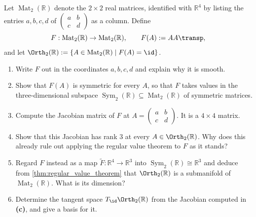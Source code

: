 \begin{exercise}
\label{ex:orthogonal_group_submanifold}
Let $\operatorname{Mat}_2(\mathbb{R})$ denote the $2\times 2$ real matrices, identified with
$\mathbb{R}^4$ by listing the entries $a,b,c,d$ of
$\left(\begin{smallmatrix} a & b \\ c & d\end{smallmatrix}\right)$ as a column. Define
\[F : \operatorname{Mat}_2(\mathbb{R}) \to \operatorname{Mat}_2(\mathbb{R}), \qquad
F(A) := AA\transp,\]
and let $\Orth_2(\mathbb{R}) := \{A \in \operatorname{Mat}_2(\mathbb{R}) \mid F(A) = \id\}$.
\begin{enumerate}[label=\textbf{(\alph*)}]
  \item Write $F$ out in the coordinates $a,b,c,d$ and explain why it is smooth.
  \item Show that $F(A)$ is symmetric for every $A$, so that $F$ takes values in the
    three-dimensional subspace $\operatorname{Sym}_2(\mathbb{R}) \subseteq
    \operatorname{Mat}_2(\mathbb{R})$ of symmetric matrices.
  \item Compute the Jacobian matrix of $F$ at $A = \left(\begin{smallmatrix} a & b \\ c &
    d\end{smallmatrix}\right)$. It is a $4\times 4$ matrix.
  \item Show that this Jacobian has rank $3$ at every $A \in \Orth_2(\mathbb{R})$. Why does this
    already rule out applying the regular value theorem to $F$ as it stands?
  \item Regard $F$ instead as a map $\widetilde F : \mathbb{R}^4 \to \mathbb{R}^3$ into
    $\operatorname{Sym}_2(\mathbb{R}) \cong \mathbb{R}^3$ and deduce from
    \cref{thm:regular_value_theorem} that $\Orth_2(\mathbb{R})$ is a submanifold of
    $\operatorname{Mat}_2(\mathbb{R})$. What is its dimension?
  \item Determine the tangent space $T_{\id}\Orth_2(\mathbb{R})$ from the Jacobian computed in
    \textbf{(c)}, and give a basis for it.
\end{enumerate}
\end{exercise}

